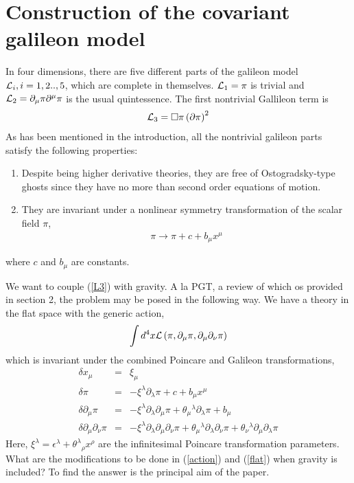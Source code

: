 \documentclass[12pt]{article}
\begin{document}
\section{Construction of the covariant galileon model}
In four dimensions, there are five different parts of the galileon model ${\cal{L}}_i, i=1,2..,5$, which are complete in themselves. ${\cal{L}}_1=\pi$ is trivial and ${\cal{L}}_2 = \partial_\mu\pi\partial^\mu\pi$ is the usual quintessence. The first nontrivial Gallileon term is
\begin{eqnarray}
{\cal{L}}_3 = \Box{\pi}
\left(\partial\pi\right)^2\label{L3}
\end{eqnarray} 
As has been mentioned in the introduction, all the nontrivial galileon parts satisfy the following properties: 
\begin{enumerate}
\item Despite being higher derivative theories, they are free of Ostogradsky-type ghosts since they have no more than second order equations of motion.
\item They are invariant under a nonlinear symmetry transformation of the scalar field $\pi$,
\begin{eqnarray}
 \pi \to \pi + c + b_\mu x^\mu \label{shift}
\end{eqnarray}
\end{enumerate} 
where $c$ and $b_\mu$ are constants.

We want to couple (\ref{L3}) with gravity. A la PGT, a review of which os provided in section 2,       
the problem may be posed in the following way. We have a theory in the flat space with the generic action, 
\begin{equation}
\int d^4x{\cal{L}}\left(\pi,\partial_\mu \pi, \partial_\mu\partial_{\nu}\pi
\right)\label{action}
\end{equation}
 which is invariant under the combined Poincare and Galileon transformations,
\begin{eqnarray}
\delta x_{\mu}&=& \xi_{\mu}\nonumber\\
\delta\pi &=& -\xi^\lambda\partial_\lambda \pi+ c + b_\mu x^\mu \nonumber\\
\delta\partial_\mu\pi &=& -\xi^\lambda\partial_\lambda
\partial_\mu \pi + \theta_\mu{}^
\lambda\partial_\lambda\pi +b_\mu\nonumber\\
\delta\partial_\mu\partial_\nu\pi &=& -\xi^\lambda\partial_\lambda
\partial_\mu\partial_\nu \pi + \theta_\mu{}^
\lambda\partial_\lambda
\partial_\nu\pi+ \theta_\nu{}^
\lambda\partial_\mu
\partial_\lambda\pi \label{flat}
\end{eqnarray}
Here, $\xi^\lambda = \epsilon^\lambda + \theta^\lambda{}_\rho x^\rho$ are the infinitesimal Poincare transformation parameters. What are the modifications to be done in (\ref{action}) and (\ref{flat}) when gravity is included? To find the answer  is the principal aim of the paper.
\end{document}
